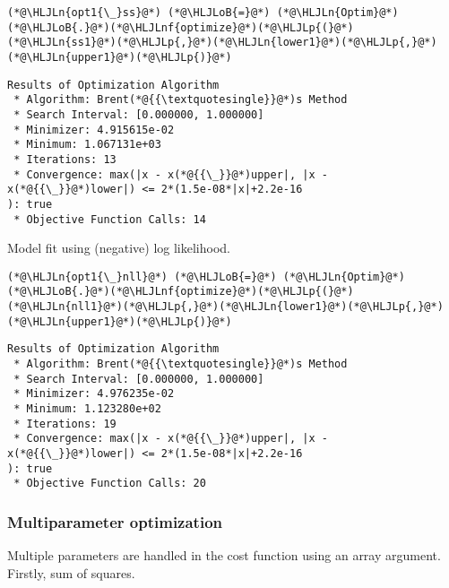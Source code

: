 \documentclass[12pt,a4paper]{article}
\newcommand{\HLJLn}[1]{#1}
\newcommand{\HLJLnf}[1]{\textcolor[RGB]{66,102,213}{#1}}
\newcommand{\HLJLoB}[1]{\textcolor[RGB]{102,102,102}{\textbf{#1}}}
\newcommand{\HLJLp}[1]{#1}
\begin{document}
\begin{lstlisting}
(*@\HLJLn{opt1{\_}ss}@*) (*@\HLJLoB{=}@*) (*@\HLJLn{Optim}@*)(*@\HLJLoB{.}@*)(*@\HLJLnf{optimize}@*)(*@\HLJLp{(}@*)(*@\HLJLn{ss1}@*)(*@\HLJLp{,}@*)(*@\HLJLn{lower1}@*)(*@\HLJLp{,}@*)(*@\HLJLn{upper1}@*)(*@\HLJLp{)}@*)
\end{lstlisting}

\begin{lstlisting}
Results of Optimization Algorithm
 * Algorithm: Brent(*@{{\textquotesingle}}@*)s Method
 * Search Interval: [0.000000, 1.000000]
 * Minimizer: 4.915615e-02
 * Minimum: 1.067131e+03
 * Iterations: 13
 * Convergence: max(|x - x(*@{{\_}}@*)upper|, |x - x(*@{{\_}}@*)lower|) <= 2*(1.5e-08*|x|+2.2e-16
): true
 * Objective Function Calls: 14
\end{lstlisting}


Model fit using (negative) log likelihood.


\begin{lstlisting}
(*@\HLJLn{opt1{\_}nll}@*) (*@\HLJLoB{=}@*) (*@\HLJLn{Optim}@*)(*@\HLJLoB{.}@*)(*@\HLJLnf{optimize}@*)(*@\HLJLp{(}@*)(*@\HLJLn{nll1}@*)(*@\HLJLp{,}@*)(*@\HLJLn{lower1}@*)(*@\HLJLp{,}@*)(*@\HLJLn{upper1}@*)(*@\HLJLp{)}@*)
\end{lstlisting}

\begin{lstlisting}
Results of Optimization Algorithm
 * Algorithm: Brent(*@{{\textquotesingle}}@*)s Method
 * Search Interval: [0.000000, 1.000000]
 * Minimizer: 4.976235e-02
 * Minimum: 1.123280e+02
 * Iterations: 19
 * Convergence: max(|x - x(*@{{\_}}@*)upper|, |x - x(*@{{\_}}@*)lower|) <= 2*(1.5e-08*|x|+2.2e-16
): true
 * Objective Function Calls: 20
\end{lstlisting}


\subsubsection{Multiparameter optimization}
Multiple parameters are handled in the cost function using an array argument. Firstly, sum of squares.
\end{document}
